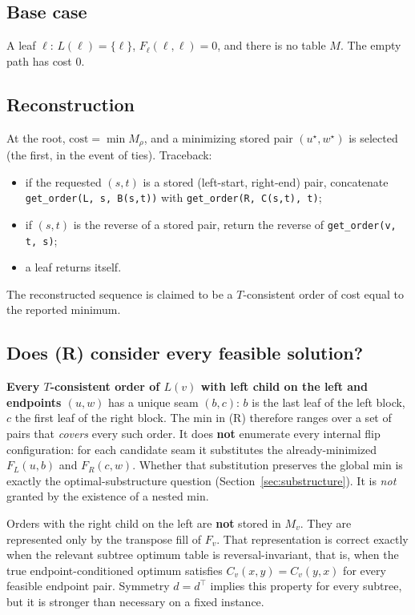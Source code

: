 \documentclass[11pt]{article}
\theoremstyle{plain}
\begin{document}
\subsection{Base case}

A leaf \(\ell\): \(L(\ell) = \{\ell\}\), \(F_\ell(\ell,\ell) = 0\), and there is
no table \(M\). The empty path has cost 0.

\subsection{Reconstruction}

At the root, \(\mathrm{cost} = \min M_\rho\), and a minimizing stored pair
\((u^\star, w^\star)\) is selected (the first, in the event of ties).
Traceback:

\begin{itemize}
\item if the requested \((s,t)\) is a stored (left-start, right-end) pair,
  concatenate \texttt{get\_order(L, s, B(s,t))} with
  \texttt{get\_order(R, C(s,t), t)};
\item if \((s,t)\) is the reverse of a stored pair, return the reverse of
  \texttt{get\_order(v, t, s)};
\item a leaf returns itself.
\end{itemize}

The reconstructed sequence is claimed to be a \(T\)-consistent order of cost
equal to the reported minimum.

\subsection{Does (R) consider every feasible solution?}

\textbf{Every \(T\)-consistent order of \(L(v)\) with left child on the left
and endpoints \((u,w)\)} has a unique seam \((b,c)\): \(b\) is the last leaf of
the left block, \(c\) the first leaf of the right block. The min in (R)
therefore ranges over a set of pairs that \emph{covers} every such order. It
does \textbf{not} enumerate every internal flip configuration: for each
candidate seam it substitutes the already-minimized \(F_L(u,b)\) and
\(F_R(c,w)\). Whether that substitution preserves the global min is exactly the
optimal-substructure question (Section~\ref{sec:substructure}). It is
\emph{not} granted by the existence of a nested min.

Orders with the right child on the left are \textbf{not} stored in \(M_v\).
They are represented only by the transpose fill of \(F_v\). That representation
is correct exactly when the relevant subtree optimum table is
reversal-invariant, that is, when the true endpoint-conditioned optimum
satisfies \(C_v(x,y)=C_v(y,x)\) for every feasible endpoint pair. Symmetry
\(d=d^\top\) implies this property for every subtree, but it is stronger than
necessary on a fixed instance.
\end{document}
